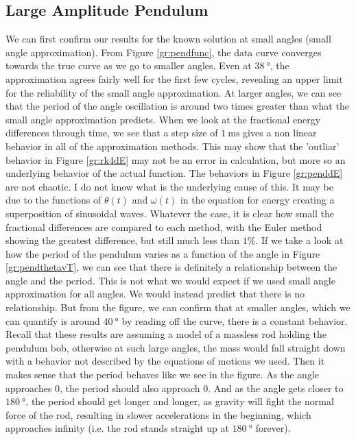 \documentclass[aps,prl,twocolumn,superscriptaddress]{revtex4-1}
\begin{document}
\subsection{Large Amplitude Pendulum}
We can first confirm our results for the known solution at small angles (small angle approximation). From Figure \ref{gr:pendfunc}, the data curve converges towards the true curve as we go to smaller angles. Even at $\SI{38}{\degree}$, the approximation agrees fairly well for the first few cycles, revealing an upper limit for the reliability of the small angle approximation. At larger angles, we can see that the period of the angle oscillation is around two times greater than what the small angle approximation predicts. When we look at the fractional energy differences through time, we see that a step size of $\SI{1}{\ms}$ gives a non linear behavior in all of the approximation methods. This may show that the 'outliar' behavior in Figure \ref{gr:rk4dE} may not be an error in calculation, but more so an underlying behavior of the actual function. The behaviors in Figure \ref{gr:penddE} are not chaotic. I do not know what is the underlying cause of this. It may be due to the functions of $\theta (t)$ and $\omega (t)$ in the equation for energy creating a superposition of sinusoidal waves. Whatever the case, it is clear how small the fractional differences are compared to each method, with the Euler method showing the greatest difference, but still much less than $1$\%.
If we take a look at how the period of the pendulum varies as a function of the angle in Figure \ref{gr:pendthetavT}, we can see that there is definitely a relationship between the angle and the period. This is not what we would expect if we used small angle approximation for all angles. We would instead predict that there is no relationship. But from the figure, we can confirm that at smaller angles, which we can quantify is around $\SI{40}{\degree}$ by reading off the curve, there is a constant behavior. Recall that these results are assuming a model of a massless rod holding the pendulum bob, otherwise at such large angles, the mass would fall straight down with a behavior not described by the equations of motions we used. Then it makes sense that the period behaves like we see in the figure. As the angle approaches 0, the period should also approach 0. And as the angle gets closer to $\SI{180}{\degree}$, the period should get longer and longer, as gravity will fight the normal force of the rod, resulting in slower accelerations in the beginning, which approaches infinity (i.e. the rod stands straight up at $\SI{180}{\degree}$ forever). 
\end{document}
